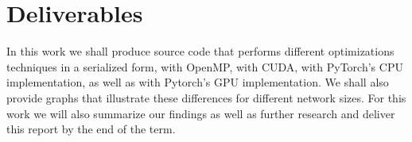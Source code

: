 \documentclass[10pt,twocolumn,letterpaper]{article}
\begin{document}
\section{Deliverables}
In this work we shall produce source code that performs different optimizations
techniques in a serialized form, with OpenMP, with CUDA, with PyTorch's CPU
implementation, as well as with Pytorch's GPU implementation. 
%
We shall also provide graphs that illustrate these differences for different
network sizes. 
%
For this work we will also summarize our findings as well as further research
and deliver this report by the end of the term.

%

%
 
%
\end{document}
